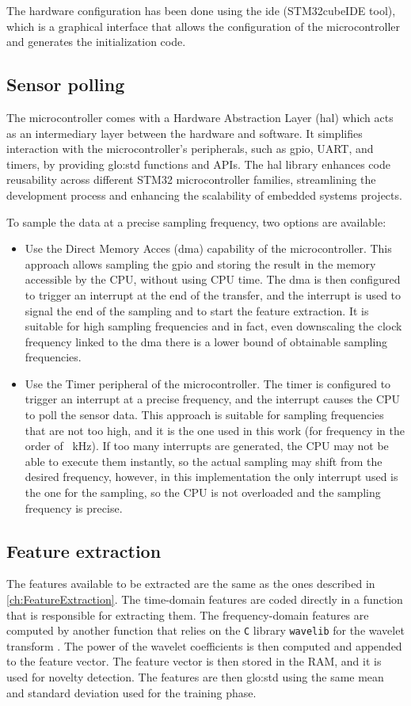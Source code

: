 The hardware configuration has been done using the \gls{ide} ({STM32cubeIDE} tool), which is a graphical interface that allows the configuration of the microcontroller and generates the initialization code. 

\subsection{Sensor polling}
The microcontroller comes with a Hardware Abstraction Layer (\gls{hal}) which acts as an intermediary layer between the hardware and software. It simplifies interaction with the microcontroller's peripherals, such as \gls{gpio}, UART, and timers, by providing \gls{glo:std} functions and APIs. The \gls{hal} library enhances code reusability across different STM32 microcontroller families, streamlining the development process and enhancing the scalability of embedded systems projects.

To sample the data at a precise sampling frequency, two options are available:
\begin{itemize}
    \item Use the Direct Memory Acces (\gls{dma}) capability of the microcontroller. This approach allows sampling the \gls{gpio} and storing the result in the memory accessible by the CPU, without using CPU time. The \gls{dma} is then configured to trigger an interrupt at the end of the transfer, and the interrupt is used to signal the end of the sampling and to start the feature extraction. It is suitable for high sampling frequencies and in fact, even downscaling the clock frequency linked to the \gls{dma} there is a lower bound of obtainable sampling frequencies.
    \item Use the Timer peripheral of the microcontroller. The timer is configured to trigger an interrupt at a precise frequency, and the interrupt causes the CPU to poll the sensor data. This approach is suitable for sampling frequencies that are not too high, and it is the one used in this work (for frequency in the order of \SI{ }{\kilo\hertz}).
    If too many interrupts are generated, the CPU may not be able to execute them instantly, so the actual sampling may shift from the desired frequency, however, in this implementation the only interrupt used is the one for the sampling, so the CPU is not overloaded and the sampling frequency is precise.
\end{itemize}


\subsection{Feature extraction}
The features available to be extracted are the same as the ones described in \autoref{ch:FeatureExtraction}. The time-domain features are coded directly in a function that is responsible for extracting them. The frequency-domain features are computed by another function that relies on the \texttt{C} library \texttt{wavelib} for the wavelet transform \cite{wavelib}. The power of the wavelet coefficients is then computed and appended to the feature vector. The feature vector is then stored in the RAM, and it is used for novelty detection.
The features are then \gls{glo:std} using the same mean and standard deviation used for the training phase. 

